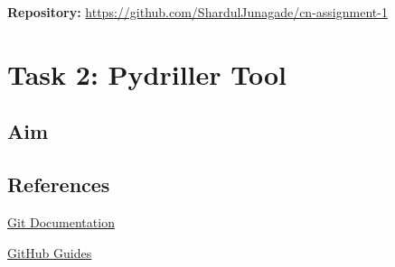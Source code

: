 \documentclass[10pt,a4paper]{report}
\begin{document}

\textbf{Repository:} \url{https://github.com/ShardulJunagade/cn-assignment-1}

\chapter{Task 2: Pydriller Tool}
\section{Aim}
\lipsum[5]

\section{References}
\begin{enumerate}[label={[\arabic*]}, itemsep=0.05em, topsep=0pt]
    \item \href{https://git-scm.com/doc}{Git Documentation}
    \item \href{https://docs.github.com/en}{GitHub Guides}
\end{enumerate}
\end{document}
